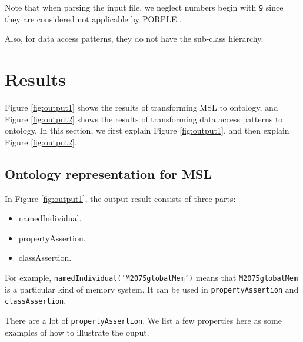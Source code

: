 \documentclass{sig-alternate}
\begin{document}
Note that when parsing the input file, we neglect numbers begin with \texttt{9} since they are considered not applicable by PORPLE \cite{porple}.

Also, for data access patterns, they do not have the sub-class hierarchy. 

\section{Results}

\begin{figure*}
\centering
{}
\caption{Example ontology representation for MSL}
\label{fig:output1}
\end{figure*}

\begin{figure*}
\centering
{}
\caption{Example ontology representation for data access patterns}
\label{fig:output2}
\end{figure*}

Figure \ref{fig:output1} shows the results of transforming MSL to ontology, and Figure \ref{fig:output2} shows the results of transforming data access patterns to ontology. In this section, we first explain Figure \ref{fig:output1}, and then explain Figure \ref{fig:output2}.

\subsection{Ontology representation for MSL}

In Figure \ref{fig:output1}, the output result consists of three parts:
\begin{itemize}
	\item namedIndividual. 
	\item propertyAssertion. 
	\item classAssertion. 
\end{itemize}

For example, \texttt{namedIndividual('M2075globalMem')} means that \texttt{M2075globalMem} is a particular kind of memory system. It can be used in \texttt{propertyAssertion} and \texttt{classAssertion}.

There are a lot of \texttt{propertyAssertion}. We list a few properties here as some examples of how to illustrate the ouput.
\end{document}
